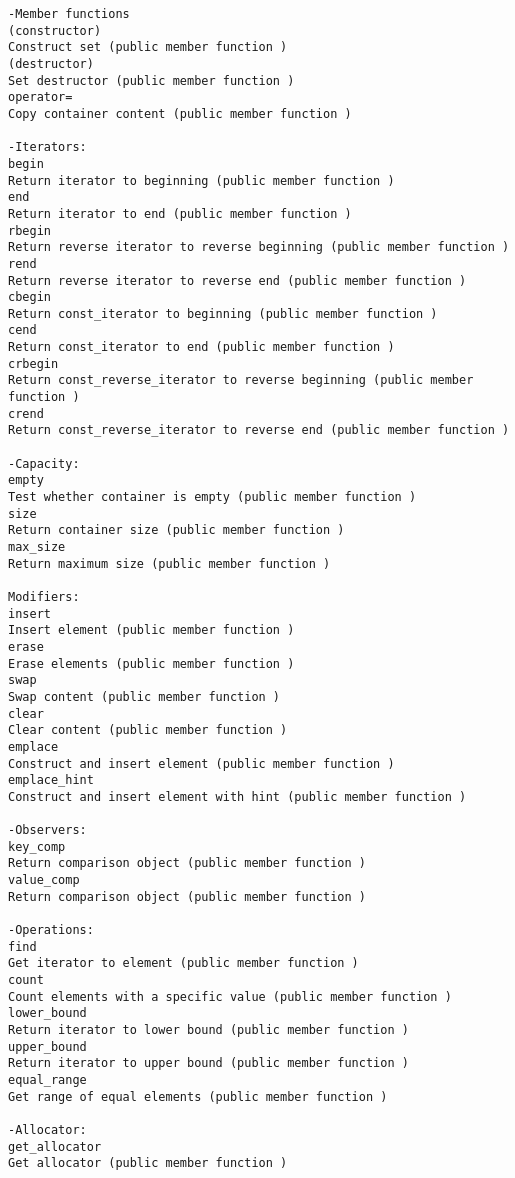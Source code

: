\begin{verbatim}
-Member functions
(constructor)
Construct set (public member function )
(destructor)
Set destructor (public member function )
operator=
Copy container content (public member function )

-Iterators:
begin
Return iterator to beginning (public member function )
end
Return iterator to end (public member function )
rbegin
Return reverse iterator to reverse beginning (public member function )
rend
Return reverse iterator to reverse end (public member function )
cbegin 
Return const_iterator to beginning (public member function )
cend 
Return const_iterator to end (public member function )
crbegin 
Return const_reverse_iterator to reverse beginning (public member function )
crend 
Return const_reverse_iterator to reverse end (public member function )

-Capacity:
empty
Test whether container is empty (public member function )
size
Return container size (public member function )
max_size
Return maximum size (public member function )

Modifiers:
insert
Insert element (public member function )
erase
Erase elements (public member function )
swap
Swap content (public member function )
clear
Clear content (public member function )
emplace 
Construct and insert element (public member function )
emplace_hint 
Construct and insert element with hint (public member function )

-Observers:
key_comp
Return comparison object (public member function )
value_comp
Return comparison object (public member function )

-Operations:
find
Get iterator to element (public member function )
count
Count elements with a specific value (public member function )
lower_bound
Return iterator to lower bound (public member function )
upper_bound
Return iterator to upper bound (public member function )
equal_range
Get range of equal elements (public member function )

-Allocator:
get_allocator
Get allocator (public member function )
\end{verbatim}
